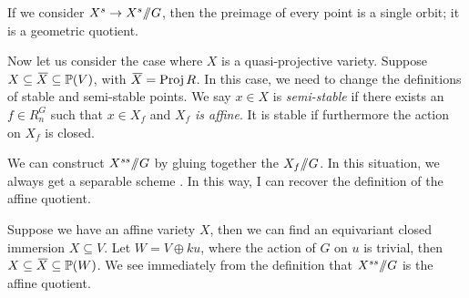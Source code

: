 If we consider $X^s\to X^s\mbox{\rm /\!\!/} G$, then the preimage of every point is a single orbit; it is a geometric quotient.

Now let us consider the case where $X$ is a quasi-projective variety. Suppose $X\subseteq \bbar X\subseteq \PP(V)$, with $\bbar X=\proj R$. In this case, we need to change the definitions of stable and semi-stable points. We say $x\in X$ is \emph{semi-stable} if there exists an $f\in R^G_n$ such that $x\in X_f$ and \emph{$X_f$ is affine}. It is stable if furthermore the action on $X_f$ is closed.

We can construct $X^{ss}\mbox{\rm /\!\!/} G$ by gluing together the $X_f\mbox{\rm /\!\!/} G$. In this situation, we always get a separable scheme \anton{}. In this way, I can recover the definition of the affine quotient.

Suppose we have an affine variety $X$, then we can find an equivariant closed immersion $X\subseteq V$. Let $W=V\oplus ku$, where the action of $G$ on $u$ is trivial, then $X\subseteq \bbar X\subseteq \PP(W)$. We see immediately from the definition that $X^{ss}\mbox{\rm /\!\!/} G$ is the affine quotient.


